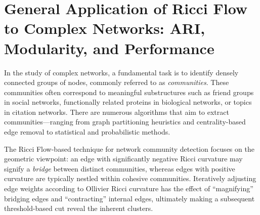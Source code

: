 \section{General Application of Ricci Flow to Complex Networks: ARI, Modularity, and Performance}
\label{sec:ricci_flow_networks}

In the study of complex networks, a fundamental task is to identify densely connected groups of nodes, commonly referred to as \emph{communities}. These communities often correspond to meaningful substructures such as friend groups in social networks, functionally related proteins in biological networks, or topics in citation networks. There are numerous algorithms that aim to extract communities---ranging from graph partitioning heuristics and centrality-based edge removal to statistical and probabilistic methods.

The Ricci Flow-based technique for network community detection focuses on the geometric viewpoint: an edge with significantly negative Ricci curvature may signify a \emph{bridge} between distinct communities, whereas edges with positive curvature are typically nestled within cohesive communities. Iteratively adjusting edge weights according to Ollivier Ricci curvature has the effect of “magnifying” bridging edges and “contracting” internal edges, ultimately making a subsequent threshold-based cut reveal the inherent clusters.

